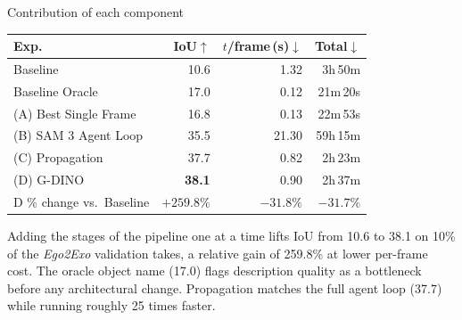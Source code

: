 \documentclass[professionalfonts,aspectratio=169]{beamer}
\begin{document}
\begin{frame}[t]
\begin{center}
{\large Contribution of each component}
\end{center}
\vfill
\begin{center}
\small
\setlength{\tabcolsep}{8pt}
\begin{tabular}{lrrr}
  \toprule
  Exp. & IoU$\uparrow$ & $t$/frame\,(s)$\downarrow$ & Total$\downarrow$ \\
  \midrule
  Baseline        & 10.6 & 1.32 & 3h\,50m \\
  Baseline Oracle & 17.0 & 0.12 & 21m\,20s \\
  \midrule
  (A) Best Single Frame & 16.8 & 0.13 & 22m\,53s \\
  (B) SAM 3 Agent Loop  & 35.5 & 21.30 & 59h\,15m \\
  (C) Propagation       & 37.7 & 0.82 & 2h\,23m \\
  (D) G-DINO            & \textbf{38.1} & 0.90 & 2h\,37m \\
  \midrule
  D \% change vs.\ Baseline & $+259.8\%$ & $-31.8\%$ & $-31.7\%$ \\
  \bottomrule
\end{tabular}
\end{center}
\vspace{0.6em}
\begin{center}
\begin{minipage}{0.9\textwidth}
\small
Adding the stages of the pipeline one at a time lifts IoU from 10.6 to 38.1 on 10\% of the \textit{Ego2Exo} validation takes, a relative gain of 259.8\% at lower per-frame cost. The oracle object name (17.0) flags description quality as a bottleneck before any architectural change. Propagation matches the full agent loop (37.7) while running roughly 25 times faster.
\end{minipage}
\end{center}
\vfill
\end{frame}

\end{document}
